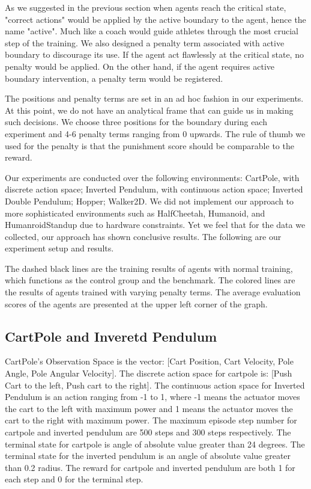 \documentclass[journal]{IEEEtran}
\begin{document}
As we suggested in the previous section when agents reach the critical state, "correct actions" would be applied by the active boundary to the agent, hence the name "active". Much like a coach would guide athletes through the most crucial step of the training. We also designed a penalty term associated with active boundary to discourage its use. If the agent act flawlessly at the critical state, no penalty would be applied. On the other hand, if the agent requires active boundary intervention, a penalty term would be registered. 

The positions and penalty terms are set in an ad hoc fashion in our experiments. At this point, we do not have an analytical frame that can guide us in making such decisions. We choose three positions for the boundary during each experiment and 4-6 penalty terms ranging from 0 upwards. The rule of thumb we used for the penalty is that the punishment score should be comparable to the reward.

Our experiments are conducted over the following environments: CartPole, with discrete action space; Inverted Pendulum, with continuous action space; Inverted Double Pendulum; Hopper; Walker2D. We did not implement our approach to more sophisticated environments such as HalfCheetah, Humanoid, and HumanroidStandup due to hardware constraints. Yet we feel that for the data we collected, our approach has shown conclusive results. The following are our experiment setup and results.

The dashed black lines are the training results of agents with normal training, which functions as the control group and the benchmark. The colored lines are the results of agents trained with varying penalty terms. The average evaluation scores of the agents are presented at the upper left corner of the graph.

\subsection{CartPole and Inveretd Pendulum}
CartPole's Observation Space is the vector: [Cart Position, Cart Velocity, Pole Angle, Pole Angular Velocity]. The discrete action space for cartpole is: [Push Cart to the left, Push cart to the right]. The continuous action space for Inverted Pendulum is an action ranging from -1 to 1, where -1 means the actuator moves the cart to the left with maximum power and 1 means the actuator moves the cart to the right with maximum power. The maximum episode step number for cartpole and inverted pendulum are 500 steps and 300 steps respectively. The terminal state for cartpole is angle of absolute value greater than 24 degrees. The terminal state for the inverted pendulum is an angle of absolute value greater than 0.2 radius. The reward for cartpole and inverted pendulum are both 1 for each step and 0 for the terminal step. 
\end{document}
